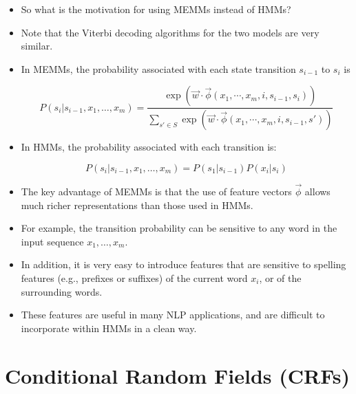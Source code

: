 \begin{itemize}

\item  So what is the motivation for using MEMMs instead of HMMs?

\item Note that the Viterbi decoding algorithms for the two models are very similar. 

\item In MEMMs, the probability associated with each state transition $s_{i-1}$ to $s_i$ is

 \begin{displaymath}
 P(s_i | s_{i-1}, x_1, \dots, x_m)  =  \frac{\exp (\vec{w}\cdot \vec{\phi}(x_1, \cdots, x_m, i, s_{i-1},s_i))}{\sum_{s' \in S} \exp (\vec{w}\cdot \vec{\phi}(x_1, \cdots, x_m, i, s_{i-1},s'))}
\end{displaymath}


\item In HMMs, the probability associated with each transition is:

\begin{displaymath}
 P(s_i | s_{i-1}, x_1, \dots, x_m) = P(s_1|s_{i-1})P(x_i|s_i)
\end{displaymath}

\item  The key advantage of MEMMs is that the use of feature vectors $\vec{\phi}$ allows much
richer representations than those used in HMMs.

\item For example, the transition probability can be sensitive to any word in the input sequence $x_1, \dots, x_m$.

\item In addition, it is very easy to introduce features that are sensitive to spelling features (e.g., prefixes or suffixes) of the current word $x_i$, or of the surrounding words.

\item These features are useful in many NLP applications, and are difficult to incorporate within HMMs in a clean way.

\end{itemize}



\section{Conditional Random Fields (CRFs)}


